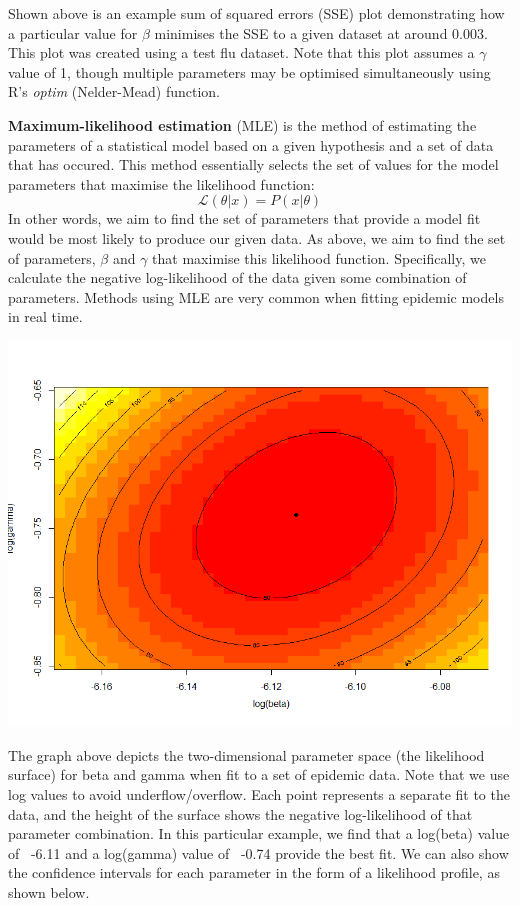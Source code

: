 \begin{framed}
Shown above is an example sum of squared errors (SSE) plot demonstrating how a particular value for $\beta$ minimises the SSE to a given dataset at around 0.003. This plot was created using a test flu dataset. Note that this plot assumes a $\gamma$ value of 1, though multiple parameters may be optimised simultaneously using R's \emph{optim} (Nelder-Mead) function.

{\bf Maximum-likelihood estimation} (MLE) is the method of estimating the parameters of a statistical model based on a given hypothesis and a set of data that has occured. This method essentially selects the set of values for the model parameters that maximise the likelihood function:
\begin{equation*}
	\mathcal{L} (\theta | x) = P(x | \theta)
\end{equation*}
In other words, we aim to find the set of parameters that  provide a model fit would be most likely to produce our given data. As above, we aim to find the set of parameters, $\beta$ and $\gamma$ that maximise this likelihood function. Specifically, we calculate the negative log-likelihood of the data given some combination of parameters. Methods using MLE are very common when fitting epidemic models in real time.\cite{white, hall, nishiura}
{\begin{center} \includegraphics[width=140mm]{logmle.png}\end{center}}
The graph above depicts the two-dimensional parameter space (the likelihood surface) for beta and gamma when fit to a set of epidemic data. Note that we use log values to avoid underflow/overflow.  Each point represents a separate fit to the data, and the height of the surface shows the negative log-likelihood of that parameter combination. In this particular example, we find that a log(beta) value of ~-6.11 and a log(gamma) value of ~-0.74 provide the best fit. We can also show the confidence intervals for each parameter in the form of a likelihood profile, as shown below.


\end{framed}
